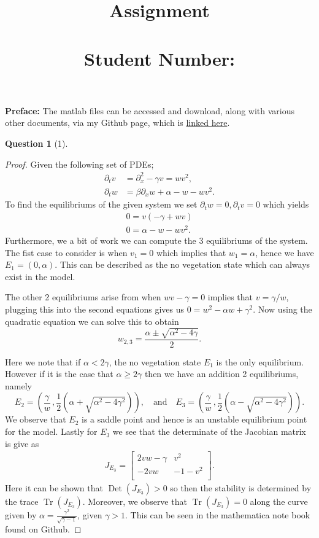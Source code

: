 \documentclass[11pt]{article}
\author{}
\title{\vspace{-50pt}
    \Huge \subject \\ Assignment \hw
\\ \vspace{20pt} \large \name \\ Student Number:\SID}
\date{}
\theoremstyle{quest}
\newtheorem*{question}{Question}
\newcommand{\Dp}{\partial}
\DeclareMathOperator{\Tr}{Tr}
\DeclareMathOperator{\Det}{Det}
\begin{document}
\maketitle{}

\textbf{Preface:} The matlab files can be accessed and download, along with various 
other documents, via my Github page, which is \href{https://github.com/JamesZor/NLDS_Assignment3}{linked here}.


\begin{question}[1]
\end{question}
\begin{proof}
    Given the following set of PDEs;
    \begin{align*}
        \Dp_t v &= \Dp_{x}^{2} - \gamma v = wv^2, \\
        \Dp_t w &= \beta \Dp_x w +\alpha -w -wv^2.
    \end{align*}
    To find the equilibriums of the given system we set $ \Dp_t w = 0, \Dp_t v = 0$ which yields
    \begin{align*}
        0= v \left( -\gamma + w v \right)\\
        0= \alpha -w -wv^2.
    \end{align*}
    Furthermore, we a bit of work we can compute the 3 equilibriums of the system.
    The fist case to consider is when $v_1 =0$ which implies that $w_1 =\alpha$, hence we have
    $E_1 = \left( 0, \alpha  \right)$. This can be described as the no vegetation state which
    can always exist in the model.

    The other 2 equilibriums arise from when $ wv-\gamma =0$ implies that $v=\gamma / w$, plugging this
    into the second equations gives us $0=w^2 - \alpha w + \gamma^2$. Now using the quadratic equation
    we can solve this to obtain $$ w_{2,3} = \frac{\alpha \pm \sqrt{ \alpha^2 - 4 \gamma }}{2}.$$

    Here we note that if $\alpha < 2 \gamma$, the no vegetation state $E_1$ is the only equilibrium.
    However if it is the case that $ \alpha \geq 2 \gamma$ then we have an addition 2 equilibriums, namely
    $$ E_2 = \left( \frac{\gamma }{w} \, , \frac{1}{2}\left(\alpha + \sqrt{\alpha^2 -4\gamma^2} \right)  \right),
    \quad \text{and} \quad E_3 = \left( \frac{\gamma }{w}\, , \frac{1}{2} \left(\alpha -\sqrt{\alpha^2 -4\gamma^2} \right)  \right). $$
    We observe that $E_2$ is a saddle point and hence is an unstable equilibrium point for the model.
    Lastly for $E_3$ we see that the determinate of the Jacobian matrix is give as
    \begin{align*}
        J_{E_3} = 
        \begin{bmatrix}
            2vw - \gamma & v^2 \\
            -2vw & -1 -v^2 \\
        \end{bmatrix}
        .
    \end{align*}
    Here it can be shown that $\Det(J_{E_3}) > 0$ so then the stability is determined by the trace $\Tr(J_{E_3})$.
    Moreover, we observe that $\Tr(J_{E_3}) = 0$ along the curve given by $\alpha = \frac{\gamma^2}{\sqrt{\gamma-1}}$, given
    $\gamma > 1$. This can be seen in the mathematica note book found on Github.
\end{proof}
\end{document}
